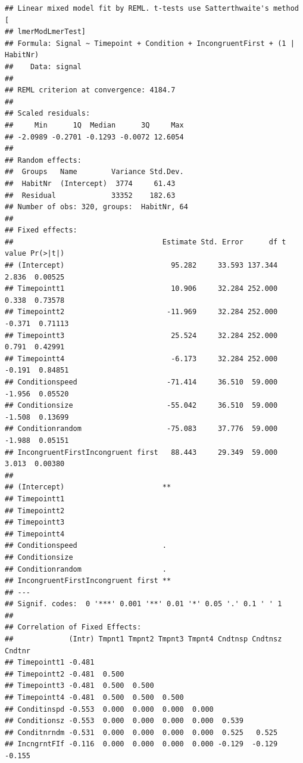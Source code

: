 \documentclass[
]{book}
\begin{document}
\begin{verbatim}
## Linear mixed model fit by REML. t-tests use Satterthwaite's method [
## lmerModLmerTest]
## Formula: Signal ~ Timepoint + Condition + IncongruentFirst + (1 | HabitNr)
##    Data: signal
## 
## REML criterion at convergence: 4184.7
## 
## Scaled residuals: 
##     Min      1Q  Median      3Q     Max 
## -2.0989 -0.2701 -0.1293 -0.0072 12.6054 
## 
## Random effects:
##  Groups   Name        Variance Std.Dev.
##  HabitNr  (Intercept)  3774     61.43  
##  Residual             33352    182.63  
## Number of obs: 320, groups:  HabitNr, 64
## 
## Fixed effects:
##                                   Estimate Std. Error      df t value Pr(>|t|)
## (Intercept)                         95.282     33.593 137.344   2.836  0.00525
## Timepointt1                         10.906     32.284 252.000   0.338  0.73578
## Timepointt2                        -11.969     32.284 252.000  -0.371  0.71113
## Timepointt3                         25.524     32.284 252.000   0.791  0.42991
## Timepointt4                         -6.173     32.284 252.000  -0.191  0.84851
## Conditionspeed                     -71.414     36.510  59.000  -1.956  0.05520
## Conditionsize                      -55.042     36.510  59.000  -1.508  0.13699
## Conditionrandom                    -75.083     37.776  59.000  -1.988  0.05151
## IncongruentFirstIncongruent first   88.443     29.349  59.000   3.013  0.00380
##                                     
## (Intercept)                       **
## Timepointt1                         
## Timepointt2                         
## Timepointt3                         
## Timepointt4                         
## Conditionspeed                    . 
## Conditionsize                       
## Conditionrandom                   . 
## IncongruentFirstIncongruent first **
## ---
## Signif. codes:  0 '***' 0.001 '**' 0.01 '*' 0.05 '.' 0.1 ' ' 1
## 
## Correlation of Fixed Effects:
##             (Intr) Tmpnt1 Tmpnt2 Tmpnt3 Tmpnt4 Cndtnsp Cndtnsz Cndtnr
## Timepointt1 -0.481                                                   
## Timepointt2 -0.481  0.500                                            
## Timepointt3 -0.481  0.500  0.500                                     
## Timepointt4 -0.481  0.500  0.500  0.500                              
## Conditinspd -0.553  0.000  0.000  0.000  0.000                       
## Conditionsz -0.553  0.000  0.000  0.000  0.000  0.539                
## Conditnrndm -0.531  0.000  0.000  0.000  0.000  0.525   0.525        
## IncngrntFIf -0.116  0.000  0.000  0.000  0.000 -0.129  -0.129  -0.155
\end{verbatim}
\end{document}
